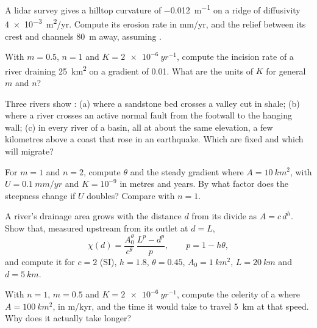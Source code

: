 \begin{exercise}[$\star$]\label{exo:b3:quantitative-geomorphology:2}
A lidar survey gives a hilltop curvature of \qty{-0.012}{m^{-1}} on a ridge
of diffusivity \qty{4e-3}{m^2/yr}. Compute its erosion rate in
\unit{mm/yr}, and the relief between its crest and channels
\qty{80}{m} away, assuming .
\end{exercise}

\begin{exercise}[$\star$]\label{exo:b3:quantitative-geomorphology:3}
With $m = 0.5$, $n = 1$ and $K = \qty{2e-6}{yr^{-1}}$, compute the
incision rate of a river draining \qty{25}{km^2} on a gradient of 0.01.
What are the units of $K$ for general $m$ and $n$?
\end{exercise}

\begin{exercise}[$\star$]\label{exo:b3:quantitative-geomorphology:4}
Three rivers show : (a) where a sandstone bed crosses a valley
cut in shale; (b) where a river crosses an active normal fault from the
footwall to the hanging wall; (c) in every river of a basin, all at about
the same elevation, a few kilometres above a coast that rose in an
earthquake. Which are fixed and which will migrate?
\end{exercise}

\begin{exercise}[$\star\star$]\label{exo:b3:quantitative-geomorphology:5}
For $m = 1$ and $n = 2$, compute $\theta$ and the steady gradient where $A =
\qty{10}{km^2}$, with $U = \qty{0.1}{mm/yr}$ and $K = 10^{-9}$ in metres and
years.
By what factor does the steepness change if $U$ doubles? Compare with $n =
1$.
\end{exercise}

\begin{exercise}[$\star\star$]\label{exo:b3:quantitative-geomorphology:6}
A river's drainage area grows with the distance $d$ from its divide as $A =
c\,d^{h}$. Show that, measured upstream from its outlet at $d = L$,
\[
\chi(d) = \frac{A_0^{\theta}}{c^{\theta}}\,\frac{L^{p} - d^{p}}{p},
\qquad p = 1 - h\theta ,
\]
and compute it for $c = 2$ (SI), $h = 1.8$, $\theta = 0.45$, $A_0 =
\qty{1}{km^2}$, $L = \qty{20}{km}$ and $d = \qty{5}{km}$.
\end{exercise}

\begin{exercise}[$\star\star$]\label{exo:b3:quantitative-geomorphology:7}
With $n = 1$, $m = 0.5$ and $K = \qty{2e-6}{yr^{-1}}$, compute the
celerity of a  where $A = \qty{100}{km^2}$, in m/kyr, and the
time it would take to travel \qty{5}{km} at that speed. Why does it
actually take longer?
\end{exercise}

